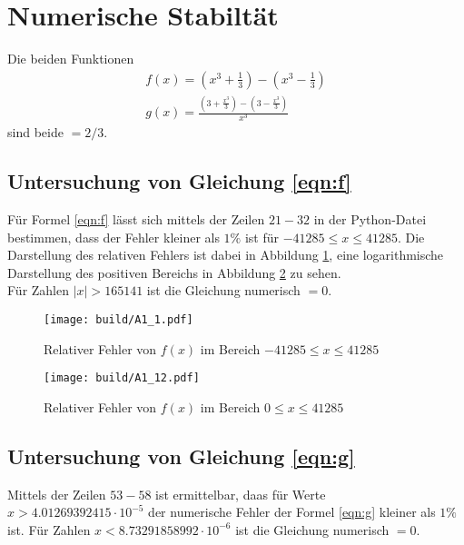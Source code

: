 



\section{Numerische Stabiltät}
Die beiden Funktionen
\begin{gather}
  f(x)=\left(x^3+\frac{1}{3}\right)-\left(x^3-\frac{1}{3}\right)\label{eqn:f}\\
  g(x)=\frac{\left(3+\frac{x^3}{3}\right)-\left(3-\frac{x^3}{3}\right)}{x^3}\label{eqn:g}
\end{gather}
sind beide $=2/3$.

\subsection{Untersuchung von Gleichung \eqref{eqn:f}}
\noindent Für Formel \eqref{eqn:f} lässt sich mittels der Zeilen $21-32$ in der Python-Datei bestimmen, dass der Fehler kleiner als $1\%$ ist für $-41285 \leq x \leq 41285$. Die Darstellung des relativen Fehlers ist dabei in Abbildung \ref{fig:FehlerF}, eine logarithmische Darstellung des positiven Bereichs in Abbildung \ref{fig:FehlerFlog} zu sehen.\\
Für Zahlen $|x|>165141$ ist die Gleichung numerisch $=0$.

\begin{figure}
  \centering
  \texttt{[image: build/A1\_1.pdf]}
  \caption{Relativer Fehler von $f(x)$ im Bereich $-41285 \leq x \leq 41285$}
  \label{fig:FehlerF}
\end{figure}

\begin{figure}
  \centering
  \texttt{[image: build/A1\_12.pdf]}
  \caption{Relativer Fehler von $f(x)$ im Bereich $0 \leq x \leq 41285$}
  \label{fig:FehlerFlog}
\end{figure}

\newpage

\subsection{Untersuchung von Gleichung \eqref{eqn:g}}
\noindent Mittels der Zeilen $53-58$ ist ermittelbar, daas für Werte $x>4.01269392415 \cdot 10^{-5}$ der numerische Fehler der Formel \eqref{eqn:g} kleiner als $1\%$ ist.
Für Zahlen $x<8.73291858992 \cdot 10^{-6}$ ist die Gleichung numerisch $=0$.

